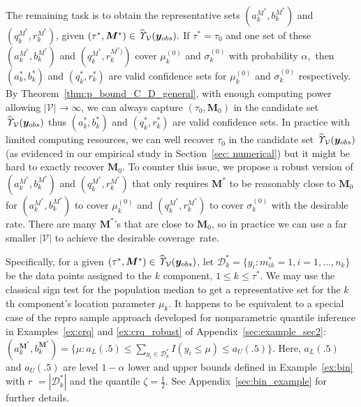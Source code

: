 \documentclass[12pt]{article}
\theoremstyle{shortspace}
\def\*#1{\bm{#1}}
\begin{document}
The remaining task is to obtain the representative sets $(a_k^{M^*}, b_k^{M^*})$ and $(q_k^{M^*}, r_k^{M^*})$, given $(\tau^*, \*M^*) \in \widehat{\it \Upsilon}_{{\mathcal V}}(\*y_{obs}).$ If $\tau^* = \tau_0$ and one set of these $(a_k^{M^*}, b_k^{M^*})$ and $(q_k^{M^*}, r_k^{M^*)})$ cover $\mu_k^{(0)}$ and $\sigma_k^{(0)}$ with probability $\alpha,$ 
then $(a^*_k, b^*_k)$ and $(q_k^{*}, r_k^{*})$ are valid confidence sets for $\mu_k^{(0)}$ and $\sigma_k^{(0)}$ respectively.
By Theorem~\ref{thm:p_bound_C_D_general}, with enough computing power allowing $|{\mathcal V}| \to \infty$, we can always capture $(\tau_0, \*M_0)$ in the candidate set $\widehat{\it \Upsilon}_{{\mathcal V}}(\*y_{obs})$ thus $(a^*_k, b^*_k)$ and $(q_k^{*}, r_k^{*})$ are valid confidence sets. In practice with limited computing resources,  we can well recover $\tau_0$ in the candidate set $\widehat{\it \Upsilon}_{{\mathcal V}}(\*y_{obs})$ (as evidenced in our empirical study in Section~\ref{sec: numerical}) but it might be hard to exactly recover $\*M_0$.  
To counter this issue, 
 we propose a robust version of $(a_k^{M^*}, b_k^{M^*})$ and $(q_k^{M^*}, r_k^{M^*})$  that only requires $\*M^*$ to be reasonably close to $\*M_0$ for $(a_k^{M^*}, b_k^{M^*})$ 
to cover $\mu_{k}^{(0)}$ and  $(q_k^{M^*}, r_k^{M^*})$ to cover $\sigma_{k}^{(0)}$ with the desirable rate. 
There are many $\*M^*$'s that are close to $\*M_0$, so in practice we can use a  far smaller $|\mathcal V|$ to achieve the desirable coverage~rate.    




 Specifically, for a given $(\tau^*, \*M^*) \in \widehat{\it \Upsilon}_{{\mathcal V}}(\*y_{obs})$, let ${\mathcal D}_k^* = \{y_i: m^*_{ik}=1, i=1, \dots, n_k\}$ be the data points assigned to the $k$ component, $1 \leq k \leq \tau^*$. 
We may use the classical sign test for the population median to get a representative set for the $k$th component's 
location parameter $\mu_k$. It happens to be equivalent to a special case of the repro sample approach developed for nonparametric quantile inference in {Examples~\ref{ex:crq} and \ref{ex:crq_robust}
 of Appendix~\ref{sec:example_sec2}}:  
 $
 (a_k^{\*M^*}, b_k^{\*M^*}) =  \big\{\mu: a_L(.5) \leq \sum\nolimits_{y_i \in {\mathcal D}_k^*} I(y_i \leq \mu ) \leq a_U(.5) \big\}. $ 
 Here, $a_L(.5)$ and $a_U(.5)$ are level $1 - \alpha$ lower and upper bounds defined in Example~\ref{ex:bin} with $r$ $ = |{\mathcal D}_k^*|$ and the quantile $\zeta = \frac12$. 
See {Appendix~\ref{sec:bin_example}} for further details. 
\end{document}
